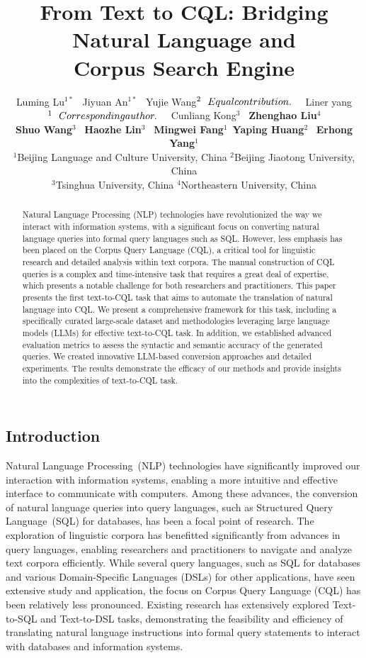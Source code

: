 \documentclass[11pt]{article}
\title{From Text to CQL: Bridging Natural Language and \\Corpus  Search Engine}
\author{Luming Lu$^{1*}$ \
  Jiyuan An$^{1*}$ \
  Yujie Wang$^{2}\relax{\ \ Equal contribution.}$ \ \ 
  Liner yang$^{1}\relax{\ \ Corresponding author.}$ \ \  
  Cunliang Kong$^{3}$ \ 
  \textbf{Zhenghao Liu}$^{4}$ \\
  \textbf{Shuo Wang}$^{3}$ \ 
  \textbf{Haozhe Lin}$^{3}$ \ 
  \textbf{Mingwei Fang}$^{1}$\ 
  \textbf{Yaping Huang}$^{2}$ \ 
  \textbf{Erhong Yang}$^{1}$ \\
  $^1$Beijing Language and Culture University, China \quad   
  $^2$Beijing Jiaotong University, China \\
  $^3$Tsinghua University, China \quad 
  $^4$Northeastern University, China \\
  }
\begin{document}
\begin{CJK*}{UTF8}{gbsn}
\maketitle
\begin{abstract}
Natural Language Processing (NLP) technologies have revolutionized the way we interact with information systems, with a significant focus on converting natural language queries into formal query languages such as SQL. However, less emphasis has been placed on the Corpus Query Language (CQL), a critical tool for linguistic research and detailed analysis within text corpora. The manual construction of CQL queries is a complex and time-intensive task that requires a great deal of expertise, which presents a notable challenge for both researchers and practitioners. This paper presents the first text-to-CQL task that aims to automate the translation of natural language into CQL. We present a comprehensive framework for this task, including a specifically curated large-scale dataset and methodologies leveraging large language models (LLMs) for effective text-to-CQL task. In addition, we established advanced evaluation metrics to assess the syntactic and semantic accuracy of the generated queries. We created innovative LLM-based conversion approaches and detailed experiments. The results demonstrate the efficacy of our methods and provide insights into the complexities of text-to-CQL task.
\end{abstract}





\section{Introduction}

Natural Language Processing~(NLP) technologies have significantly improved our interaction with information systems, enabling a more intuitive and effective interface to communicate with computers. Among these advances, the conversion of natural language queries into query languages, such as Structured Query Language~(SQL) for databases, has been a focal point of research. The exploration of linguistic corpora has benefitted significantly from advances in query languages, enabling researchers and practitioners to navigate and analyze text corpora efficiently. While several query languages, such as SQL for databases and various Domain-Specific Languages (DSLs) for other applications, have seen extensive study and application, the focus on Corpus Query Language (CQL) has been relatively less pronounced. Existing research has extensively explored Text-to-SQL\citep{zhong2017seq2sql, liu2022tapex, yu-etal-2018-spider, li2023resdsql, gao2023texttosql, pourreza2023dinsql, dong2023c3, li2023can} and Text-to-DSL\citep{wang2023grammar, staniek2023texttooverpassql} tasks, demonstrating the feasibility and efficiency of translating natural language instructions into formal query statements to interact with databases and information systems.


\end{CJK*}
\end{document}
